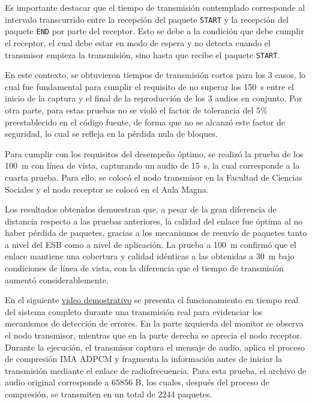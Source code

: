 Es importante destacar que el tiempo de transmisión contemplado corresponde al intervalo transcurrido entre la recepción del paquete \texttt{START} y la recepción del paquete \texttt{END} por parte del receptor.
Esto se debe a la condición que debe cumplir el receptor, el cual debe estar en modo de espera y no detecta cuando el transmisor empieza la transmisión, sino hasta que recibe el paquete \texttt{START}.

En este contexto, se obtuvieron tiempos de transmisión cortos para los 3 casos, lo cual fue fundamental para cumplir el requisito de no superar los \SI{150}{\second} entre el inicio de la captura y el final de la reproducción de los $3$ audios en conjunto.
Por otra parte, para estas pruebas no se violó el factor de tolerancia del $5\%$ preestablecido en el código fuente, de forma que no se alcanzó este factor de seguridad, lo cual se refleja en la pérdida nula de bloques.

Para cumplir con los requisitos del desempeño óptimo, se realizó la prueba de los \SI{100}{\meter} con línea de vista, capturando un audio de \SI{15}{\second}, la cual corresponde a la cuarta prueba.
Para ello, se colocó el nodo transmisor en la Facultad de Ciencias Sociales y el nodo receptor se colocó en el Aula Magna.

Los resultados obtenidos demuestran que, a pesar de la gran diferencia de distancia respecto a las pruebas anteriores, la calidad del enlace fue óptima al no haber pérdida de paquetes, gracias a los mecanismos de reenvío de paquetes tanto a nivel del ESB como a nivel de aplicación. 
La prueba a \SI{100}{\meter} confirmó que el enlace mantiene una cobertura y calidad idénticas a las obtenidas a \SI{30}{\meter} bajo condiciones de línea de vista, con la diferencia que el tiempo de transmisión aumentó considerablemente.

En el siguiente \href{https://youtu.be/31yQ3FNfaJI?si=LQ8k5ROzQWWf9_tA}{video demostrativo} se presenta el funcionamiento en tiempo real del sistema completo durante una transmisión real para evidenciar los mecanismos de detección de errores.
En la parte izquierda del monitor se observa el nodo transmisor, mientras que en la parte derecha se aprecia el nodo receptor.
Durante la ejecución, el transmisor captura el mensaje de audio, aplica el proceso de compresión IMA ADPCM y fragmenta la información antes de iniciar la transmisión mediante el enlace de radiofrecuencia.
Para esta prueba, el archivo de audio original corresponde a $65856$ B, los cuales, después del proceso de compresión, se transmiten en un total de $2244$ paquetes.

